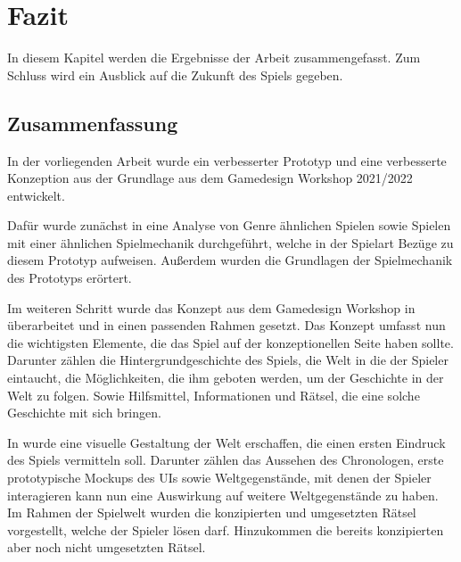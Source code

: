 \chapter{Fazit}\label{sec:fazit}
In diesem Kapitel werden die Ergebnisse der Arbeit zusammengefasst. Zum Schluss wird ein Ausblick auf die Zukunft des Spiels gegeben.
\section{Zusammenfassung}
In der vorliegenden Arbeit wurde ein verbesserter Prototyp und eine verbesserte Konzeption aus der Grundlage aus dem Gamedesign Workshop 2021/2022 entwickelt. 

Dafür wurde zunächst in   eine Analyse von Genre ähnlichen Spielen sowie Spielen mit einer ähnlichen Spielmechanik durchgeführt, welche in der Spielart Bezüge zu diesem Prototyp aufweisen. Außerdem wurden die Grundlagen der Spielmechanik des Prototyps erörtert.

Im weiteren Schritt wurde das Konzept aus dem Gamedesign Workshop in  überarbeitet und in einen passenden Rahmen gesetzt. Das Konzept umfasst nun die wichtigsten Elemente, die das Spiel auf der konzeptionellen Seite haben sollte. Darunter zählen die Hintergrundgeschichte des Spiels, die Welt in die der Spieler eintaucht, die Möglichkeiten, die ihm geboten werden, um der Geschichte in der Welt zu folgen. Sowie Hilfsmittel, Informationen und Rätsel, die eine solche Geschichte mit sich bringen.

In  wurde eine visuelle Gestaltung der Welt erschaffen, die einen ersten Eindruck des Spiels vermitteln soll. Darunter zählen das Aussehen des Chronologen, erste prototypische Mockups des \ac{UI}s sowie Weltgegenstände, mit denen der Spieler interagieren kann nun eine Auswirkung auf weitere Weltgegenstände zu haben. Im Rahmen der Spielwelt wurden die konzipierten und umgesetzten Rätsel vorgestellt, welche der Spieler lösen darf. Hinzukommen die bereits konzipierten aber noch nicht umgesetzten Rätsel. 

